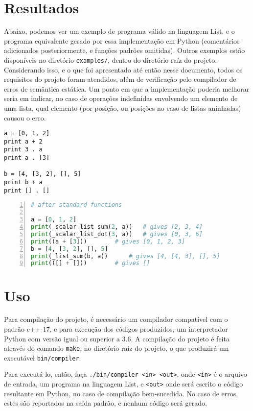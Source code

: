 \documentclass{article}
\begin{document}
\section{Resultados}
\label{sec:resultados}
Abaixo, podemos ver um exemplo de programa válido na linguagem List, e o programa equivalente gerado por essa implementação em Python (comentários adicionados posteriormente, e funções padrões omitidas). Outros exemplos estão disponíveis no diretório \texttt{examples/}, dentro do diretório raíz do projeto. Considerando isso, e o que foi apresentado até então nesse documento, todos os requisitos do projeto foram atendidos, além de verificação pelo compilador de erros de semântica estática. Um ponto em que a implementação poderia melhorar seria em indicar, no caso de operações indefinidas envolvendo um elemento de uma lista, qual elemento (por posição, ou posições no caso de listas aninhadas) causou o erro.

\begin{lstlisting}[language=List]
a = [0, 1, 2]
print a + 2
print 3 . a
print a . [3]

b = [4, [3, 2], [], 5]
print b + a
print [] . []
\end{lstlisting}

\begin{lstlisting}[language=Python, numbers=left, numberstyle=\scriptsize]
# after standard functions

a = [0, 1, 2]
print(_scalar_list_sum(2, a))	# gives [2, 3, 4]
print(_scalar_list_dot(3, a))	# gives [0, 3, 6]
print((a + [3]))		# gives [0, 1, 2, 3]
b = [4, [3, 2], [], 5]
print(_list_sum(b, a))		# gives [4, [4, 3], [], 5]
print(([] + []))		# gives []
\end{lstlisting}

\appendix
\section{Uso}
\label{sec:uso}
Para compilação do projeto, é necessário um compilador compatível com o padrão c++-17, e para execução dos códigos produzidos, um interpretador Python com versão igual ou superior a 3.6. A compilação do projeto é feita através do comando \texttt{make}, no diretório raíz do projeto, o que produzirá um executável \texttt{bin/compiler}.

Para executá-lo, então, faça \texttt{./bin/compiler <in> <out>}, onde \texttt{<in>} é o arquivo de entrada, um programa na linguagem List, e \texttt{<out>} onde será escrito o código resultante em Python, no caso de compilação bem-sucedida. No caso de erros, estes são reportados na saída padrão, e nenhum código será gerado.
\end{document}
